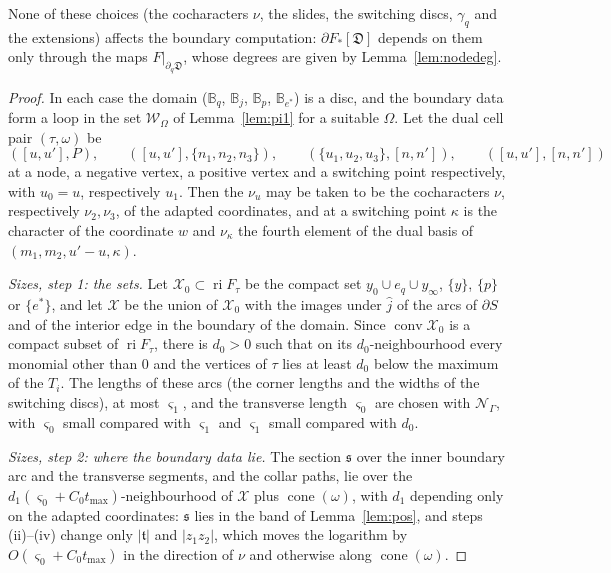 \begin{lemma}
None of these choices (the cocharacters $\nu$, the slides, the switching discs, $\gamma_q$ and the extensions) affects the
boundary computation: $\partial F_*[\mathfrak D]$ depends on them only through the maps $F|_{\partial_q\mathfrak D}$, whose
degrees are given by Lemma~\ref{lem:nodedeg}.
\end{lemma}
\begin{proof}
In each case the domain ($\mathbb B_q$, $\mathbb B_j$, $\mathbb B_p$, $\mathbb B_{e^*}$) is a disc, and the boundary data form a
loop in the set $\mathscr W_\Omega$ of Lemma~\ref{lem:pi1} for a suitable $\Omega$. Let the dual cell pair $(\tau,\omega)$ be
\[
([u,u'],P),\qquad([u,u'],\{n_1,n_2,n_3\}),\qquad(\{u_1,u_2,u_3\},[n,n']),\qquad([u,u'],[n,n'])
\]
at a node, a negative vertex, a positive vertex and a switching point respectively, with $u_0=u$, respectively $u_1$. Then the $\nu_u$ may be taken to be the cocharacters $\nu$, respectively
$\nu_2,\nu_3$, of the adapted coordinates, and at a switching point $\kappa$ is the character of the coordinate $w$ and
$\nu_\kappa$ the fourth element of the dual basis of $(m_1,m_2,u'-u,\kappa)$.

\emph{Sizes, step 1: the sets.} Let $\mathcal X_0\subset\operatorname{ri}F_\tau$ be the compact set $y_0\cup e_q\cup y_\infty$,
$\{y\}$, $\{p\}$ or $\{e^*\}$, and let $\mathcal X$ be the union of $\mathcal X_0$ with the images under $\hat j$ of the arcs of
$\partial S$ and of the interior edge in the boundary of the domain. Since $\operatorname{conv}\mathcal X_0$ is a compact subset
of $\operatorname{ri}F_\tau$, there is $d_0>0$ such that on its $d_0$-neighbourhood every monomial other than $0$ and the vertices
of $\tau$ lies at least $d_0$ below the maximum of the $T_i$. The lengths of these arcs (the corner lengths and the widths of the
switching discs), at most $\varsigma_1$, and the transverse length $\varsigma_0$ are chosen with $\mathcal N_\Gamma$, with
$\varsigma_0$ small compared with $\varsigma_1$ and $\varsigma_1$ small compared with $d_0$.

\emph{Sizes, step 2: where the boundary data lie.} The section $\mathfrak s$ over the inner boundary arc and the transverse
segments, and the collar paths, lie over the $d_1(\varsigma_0+C_0t_{\max})$-neighbourhood of $\mathcal X$ plus
$\operatorname{cone}(\omega)$, with $d_1$ depending only on the adapted coordinates: $\mathfrak s$ lies in the band of
Lemma~\ref{lem:pos}, and steps (ii)--(iv) change only $|\mathfrak t|$ and $|z_1z_2|$, which moves the logarithm by
$O(\varsigma_0+C_0t_{\max})$ in the direction of $\nu$ and otherwise along $\operatorname{cone}(\omega)$.


\end{proof}
